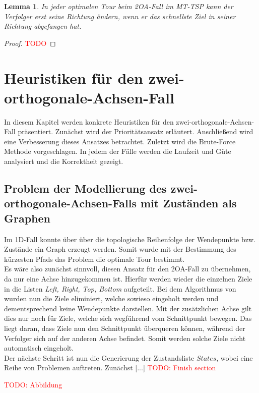 \documentclass[german,version-2019-11]{uzl-thesis}
\newtheorem{lem}{Lemma}
\begin{document}
\begin{lem}
In jeder optimalen Tour beim 2OA-Fall im MT-TSP kann der Verfolger erst seine Richtung ändern, wenn er das schnellste Ziel in seiner Richtung abgefangen hat.
\end{lem}

\begin{proof}
\textcolor{red}{TODO}
\end{proof}


\chapter{Heuristiken für den zwei-orthogonale-Achsen-Fall}

In diesem Kapitel werden konkrete Heuristiken für den zwei-orthogonale-Achsen-Fall präsentiert. Zunächst wird der Prioritätsansatz erläutert. Anschließend wird eine Verbesserung dieses Ansatzes betrachtet. Zuletzt wird die Brute-Force Methode vorgeschlagen. In jedem der Fälle werden die Laufzeit und Güte analysiert und die Korrektheit gezeigt.

\section{Problem der Modellierung des zwei-orthogonale-Achsen-Falls mit Zuständen als Graphen}
Im 1D-Fall konnte über über die topologische Reihenfolge der Wendepunkte bzw. Zustände ein Graph erzeugt werden. Somit wurde mit der Bestimmung des kürzesten Pfads das Problem die optimale Tour bestimmt. \\
Es wäre also zunächst sinnvoll, diesen Ansatz für den 2OA-Fall zu übernehmen, da nur eine Achse hinzugekommen ist. Hierfür werden wieder die einzelnen Ziele in die Listen \emph{Left, Right, Top, Bottom} aufgeteilt. Bei dem Algorithmus von \cite{helvig} wurden nun die Ziele eliminiert, welche sowieso eingeholt werden und dementsprechend keine Wendepunkte darstellen. Mit der zusätzlichen Achse gilt dies nur noch für Ziele, welche sich wegführend vom Schnittpunkt bewegen. Das liegt daran, dass Ziele nun den Schnittpunkt überqueren können, während der Verfolger sich auf der anderen Achse befindet. Somit werden solche Ziele nicht automatisch eingeholt. \\
Der nächste Schritt ist nun die Generierung der Zustandsliste $States$, wobei eine Reihe von Problemen auftreten. Zunächst [...]
\textcolor{red}{TODO: Finish section}

\textcolor{red}{TODO: Abbildung}
\newpage
\end{document}
